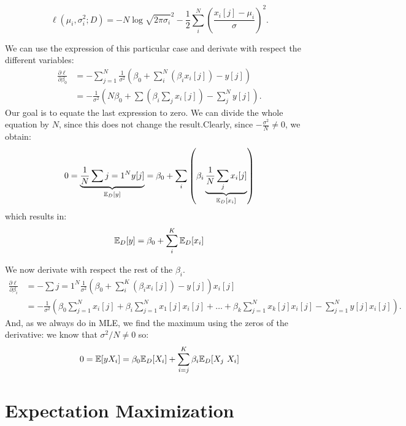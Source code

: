 \[
    \ell(\mu_{i},\sigma_{i}^{2};D) = - N \log \sqrt{2\pi \sigma_i}^2 - \frac{1}{2}\sum_i^N  \left(\frac{x_i[j] - \mu_i}{\sigma}\right)^2.
\]

We can use the expression of this particular case and derivate with respect the different variables:
\begin{align*}
    \frac{\partial \ell}{\partial \beta_0} & = - \sum_{j=1}^N \frac{1}{\sigma^2} \left( \beta_0 + \sum_i^N \left(\beta_i x_i[j]\right) -y[j]\right)    \\
                                           & = - \frac{1}{\sigma^2} \left(N \beta_0 + \sum \left(\beta_i \sum_j x_i[j]\right) - \sum_j^N y[j] \right).
\end{align*}
Our goal is to equate the last expression to zero. We can divide the whole equation by \(N\), since this does not change the result.Clearly, since \(-\frac{\sigma^2}{N} \neq 0\), we obtain:
\[
    0 = \underbrace{\frac{1}{N}\sum{j=1}^N y[j]}_{\mathbb{E}_D[y]} = \beta_0 + \sum_{i}\left( \beta_i \underbrace{\frac{1}{N} \sum_j x_i[j]}_{\mathbb{E}_D[x_i]}\right)
\]
which results in:
\begin{equation}\label{MLE:LGM}
    \mathbb{E}_D[y] = \beta_0 + \sum_i^K \mathbb{E}_D[x_i]
\end{equation}

We now derivate with respect the rest of the \(\beta_i\).
\begin{align*}
    \frac{\partial \ell}{\partial \beta_i} & = -  \sum{j=1}^N \frac{1}{\sigma^2} \left( \beta_0 + \sum_i^K \left(\beta_i x_i[j]\right) - y[j] \right)x_i[j]                                                             \\
                                           & = - \frac{1}{\sigma^2} \left(\beta_0 \sum_{j=1}^N x_i[j] + \beta_i \sum_{j=1}^N x_1[j]x_i[j] + \dots + \beta_k \sum_{j=1}^N x_k[j]x_i[j] - \sum_{j=1}^N y[j]x_i[j]\right).
\end{align*}
And, as we always do in MLE, we find the maximum using the zeros of the derivative: we know that \(\sigma^2/N \neq 0\) so:
\begin{equation}\label{MLE:LGM:2}
    0 = \E[y X_i]  = \beta_0 \E_D[X_i] + \sum_{i=j}^K \beta_i \E_D[X_j \ X_i]
\end{equation}



\section{Expectation Maximization}


